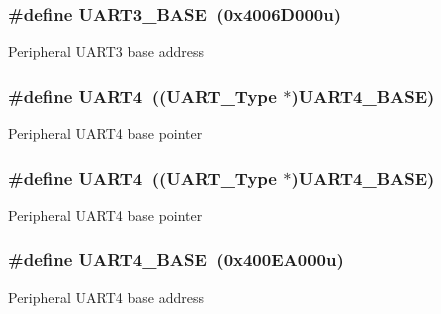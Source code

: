 \subsubsection[{\texorpdfstring{U\+A\+R\+T3\+\_\+\+B\+A\+SE}{UART3_BASE}}]{\setlength{\rightskip}{0pt plus 5cm}\#define U\+A\+R\+T3\+\_\+\+B\+A\+SE~(0x4006\+D000u)}\hypertarget{group__UART__Peripheral__Access__Layer_ga2eff3896840fdf741bd67d2d7fe99a34}{}\label{group__UART__Peripheral__Access__Layer_ga2eff3896840fdf741bd67d2d7fe99a34}
Peripheral U\+A\+R\+T3 base address 
\subsubsection[{\texorpdfstring{U\+A\+R\+T4}{UART4}}]{\setlength{\rightskip}{0pt plus 5cm}\#define U\+A\+R\+T4~(({\bf U\+A\+R\+T\+\_\+\+Type} $\ast$){\bf U\+A\+R\+T4\+\_\+\+B\+A\+SE})}\hypertarget{group__UART__Peripheral__Access__Layer_ga7c035f6f443c999fc043b2b7fb598800}{}\label{group__UART__Peripheral__Access__Layer_ga7c035f6f443c999fc043b2b7fb598800}
Peripheral U\+A\+R\+T4 base pointer 
\subsubsection[{\texorpdfstring{U\+A\+R\+T4}{UART4}}]{\setlength{\rightskip}{0pt plus 5cm}\#define U\+A\+R\+T4~(({\bf U\+A\+R\+T\+\_\+\+Type} $\ast$){\bf U\+A\+R\+T4\+\_\+\+B\+A\+SE})}\hypertarget{group__UART__Peripheral__Access__Layer_ga7c035f6f443c999fc043b2b7fb598800}{}\label{group__UART__Peripheral__Access__Layer_ga7c035f6f443c999fc043b2b7fb598800}
Peripheral U\+A\+R\+T4 base pointer 
\subsubsection[{\texorpdfstring{U\+A\+R\+T4\+\_\+\+B\+A\+SE}{UART4_BASE}}]{\setlength{\rightskip}{0pt plus 5cm}\#define U\+A\+R\+T4\+\_\+\+B\+A\+SE~(0x400\+E\+A000u)}\hypertarget{group__UART__Peripheral__Access__Layer_ga94d92270bf587ccdc3a37a5bb5d20467}{}\label{group__UART__Peripheral__Access__Layer_ga94d92270bf587ccdc3a37a5bb5d20467}
Peripheral U\+A\+R\+T4 base address 
